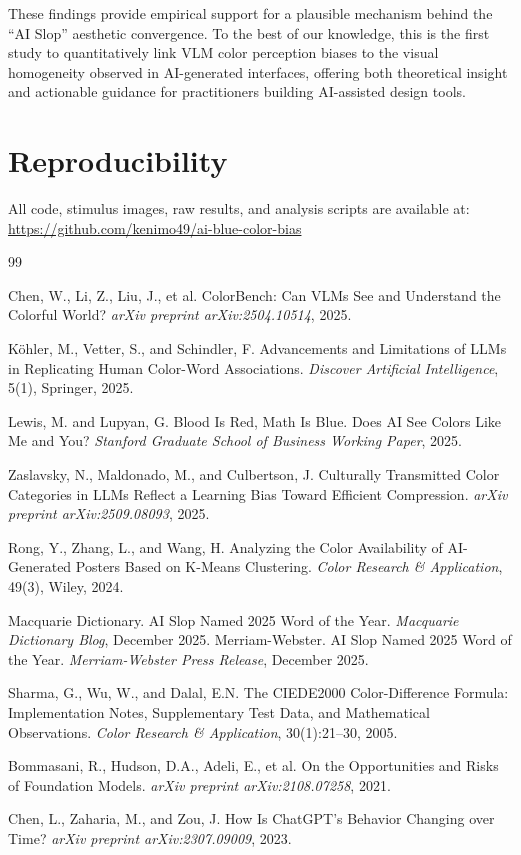 \documentclass[11pt,a4paper]{article}
\begin{document}
These findings provide empirical support for a plausible mechanism behind the ``AI Slop'' aesthetic convergence. To the best of our knowledge, this is the first study to quantitatively link VLM color perception biases to the visual homogeneity observed in AI-generated interfaces, offering both theoretical insight and actionable guidance for practitioners building AI-assisted design tools.

\section*{Reproducibility}

All code, stimulus images, raw results, and analysis scripts are available at:\\
\url{https://github.com/kenimo49/ai-blue-color-bias}

\begin{thebibliography}{99}

Chen, W., Li, Z., Liu, J., et al.
ColorBench: Can VLMs See and Understand the Colorful World?
\textit{arXiv preprint arXiv:2504.10514}, 2025.

K\"ohler, M., Vetter, S., and Schindler, F.
Advancements and Limitations of LLMs in Replicating Human Color-Word Associations.
\textit{Discover Artificial Intelligence}, 5(1), Springer, 2025.

Lewis, M. and Lupyan, G.
Blood Is Red, Math Is Blue. Does AI See Colors Like Me and You?
\textit{Stanford Graduate School of Business Working Paper}, 2025.

Zaslavsky, N., Maldonado, M., and Culbertson, J.
Culturally Transmitted Color Categories in LLMs Reflect a Learning Bias Toward Efficient Compression.
\textit{arXiv preprint arXiv:2509.08093}, 2025.

Rong, Y., Zhang, L., and Wang, H.
Analyzing the Color Availability of AI-Generated Posters Based on K-Means Clustering.
\textit{Color Research \& Application}, 49(3), Wiley, 2024.

Macquarie Dictionary.
AI Slop Named 2025 Word of the Year.
\textit{Macquarie Dictionary Blog}, December 2025.
Merriam-Webster.
AI Slop Named 2025 Word of the Year.
\textit{Merriam-Webster Press Release}, December 2025.

Sharma, G., Wu, W., and Dalal, E.N.
The CIEDE2000 Color-Difference Formula: Implementation Notes, Supplementary Test Data, and Mathematical Observations.
\textit{Color Research \& Application}, 30(1):21--30, 2005.

Bommasani, R., Hudson, D.A., Adeli, E., et al.
On the Opportunities and Risks of Foundation Models.
\textit{arXiv preprint arXiv:2108.07258}, 2021.

Chen, L., Zaharia, M., and Zou, J.
How Is ChatGPT's Behavior Changing over Time?
\textit{arXiv preprint arXiv:2307.09009}, 2023.

\end{thebibliography}
\end{document}
